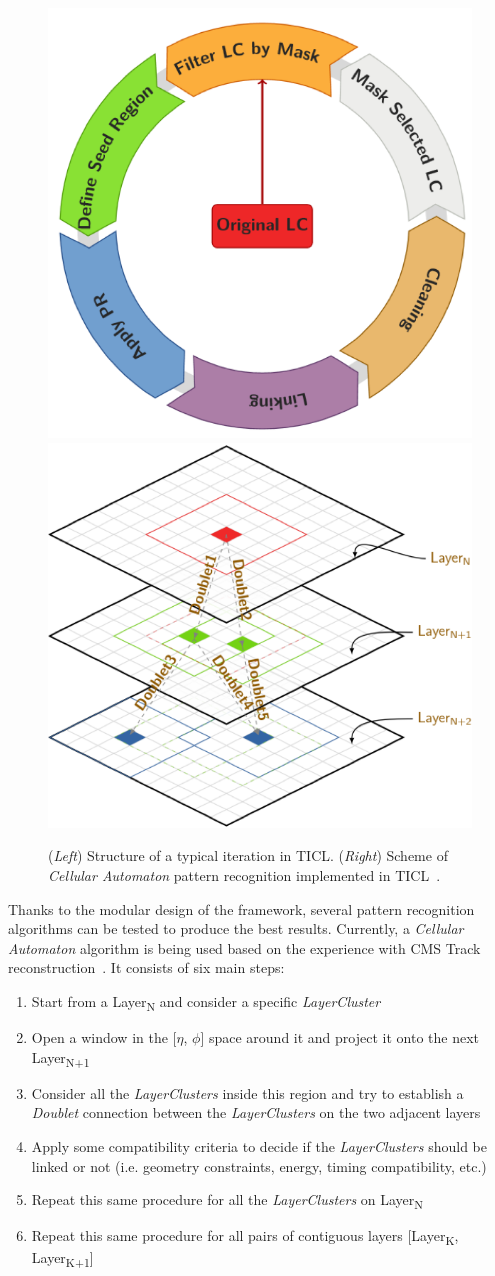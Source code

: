 \begin{figure}[tbp]
    \centering %
    \includegraphics[width=.4\textwidth]{chapters/HGCal/figures/chef/iter}
    \qquad
    \includegraphics[width=.4\textwidth]{chapters/HGCal/figures/chef/pralgo}
    \caption{\label{fig:iter} (\emph{Left}) Structure of a typical iteration in TICL. (\emph{Right}) Scheme of \emph{Cellular Automaton} pattern recognition implemented in TICL~\cite{ticlwebsite}.}
\end{figure}

Thanks to the modular design of the framework, several pattern recognition algorithms can be tested to produce the best results. Currently, a \emph{Cellular Automaton} algorithm is being used based on the experience with CMS Track reconstruction~\cite{Funke:2014dga}. It consists of six main steps:

\begin{enumerate}
\itemsep0em
    \item Start from a Layer\textsubscript{N} and consider a specific \emph{LayerCluster}
    \item Open a window in the [$\eta$, $\phi$] space around it and project it onto the next Layer\textsubscript{N+1}
    \item Consider all the \emph{LayerClusters} inside this region and try to establish a \emph{Doublet} connection between the \emph{LayerClusters} on the two adjacent layers
    \item Apply some compatibility criteria to decide if the \emph{LayerClusters} should be linked or not (i.e. geometry constraints, energy, timing compatibility, etc.)
    \item Repeat this same procedure for all the \emph{LayerClusters} on Layer\textsubscript{N}
    \item Repeat this same procedure for all pairs of contiguous layers [Layer\textsubscript{K}, Layer\textsubscript{K+1}]
\end{enumerate}


